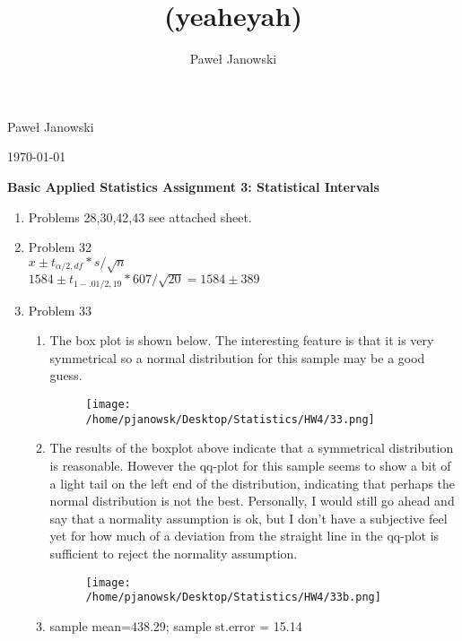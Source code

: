 \documentclass[11pt,letterpaper]{article}
\title{(yeaheyah)}
\author{Pawe\l{} Janowski}
\begin{document}
\begin{flushright}
\parskip 0pt
Pawe\l{} Janowski
 
\today
\vspace{10 mm}
\end{flushright}
\begin{center}
\begin{Large}
\textbf{Basic Applied Statistics
Assignment 3: Statistical Intervals}
\vspace{10 mm}
\end{Large}
\end{center}


\begin{enumerate}
\item Problems 28,30,42,43 see attached sheet.
\item Problem 32\\
      $x\pm t_{\alpha/2,df}*s/\sqrt{n}$\\
      $1584\pm t_{1-.01/2,19}*607/\sqrt{20} = 1584\pm 389$
\item Problem 33\\
    \begin{enumerate}
        \item The box plot is shown below. The interesting feature is that it is very symmetrical so a normal distribution for this sample may be a good guess.
                \begin{figure}[H]
                    \centering
                    \texttt{[image: /home/pjanowsk/Desktop/Statistics/HW4/33.png]}
                \end{figure}
        \item The results of the boxplot above indicate that a symmetrical distribution is reasonable. However the qq-plot for this sample seems to show a bit of a light tail on the left end of the distribution, indicating that perhaps the normal distribution is not the best. Personally, I would still go ahead and say that a normality assumption is ok, but I don't have a subjective feel yet for how much of a deviation from the straight line in the qq-plot is sufficient to reject the normality assumption.
                \begin{figure}[H]
                    \centering
                    \texttt{[image: /home/pjanowsk/Desktop/Statistics/HW4/33b.png]}
                \end{figure}
        \item sample mean=438.29; sample st.error = 15.14 \\

\end{enumerate}
\end{enumerate}
\end{document}
